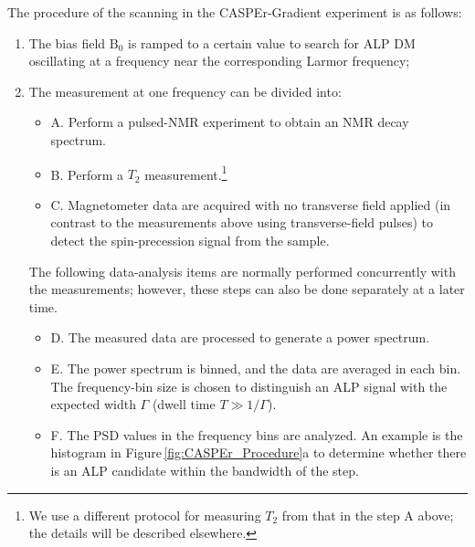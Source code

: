 The procedure of the scanning in the CASPEr-Gradient experiment is as follows:
\begin{enumerate}[label = (\arabic*)]
    \item The bias field $\mathrm{B}_0$ is ramped to a certain value to search for ALP DM oscillating at a frequency near the corresponding Larmor frequency; 
    \item The measurement at one frequency can be divided into:
    \begin{itemize}[label={}] %
        \item A. Perform a pulsed-NMR experiment to obtain an NMR decay spectrum.
        \item B. Perform a $T_2$ measurement.\footnote{We use a different protocol for measuring $T_2$ from that in the step A above; the details will be described elsewhere.}
        \item C. Magnetometer data are acquired with no transverse field applied (in contrast to the measurements above using transverse-field pulses) to detect the spin-precession signal from the sample. 
        \end{itemize}
        The following data-analysis items are normally performed concurrently with the measurements; however, these steps can also be done separately at a later time.
    \begin{itemize}[label={}]
        \item D. The measured data are processed to generate a power spectrum. 
        \item E. The power spectrum is binned, and the data are averaged in each bin. %
        The frequency-bin size is chosen to distinguish an ALP signal with the expected width $\Gamma$ (dwell time $T \gg 1/\Gamma$). 
        \item F. The PSD values in the frequency bins are analyzed. An example is the histogram in Figure\,\ref{fig:CASPEr_Procedure}a to determine whether there is an ALP candidate within the bandwidth of the step. 

\end{itemize}
\end{enumerate}
